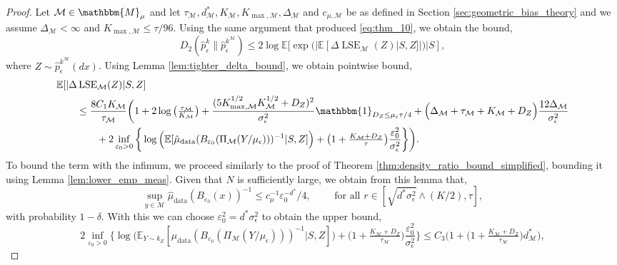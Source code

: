 \documentclass[10pt]{article}
\theoremstyle{plain}
\theoremstyle{definition}
\theoremstyle{remark}
\newcommand{\M}{{\mathcal{M}}}
\newcommand{\lse}{\operatorname{LSE}}
\newcommand{\E}{\mathbb{E}}
\newcommand{\gap}{\Delta_\M}
\begin{document}
\begin{proof}
Let \(\M \in \mathbbm{M}_\mu\) and let \(\tau_\M, d^*_\M, K_\M, K_{\max, \M}, \gap\) and \(c_{\mu, \M}\) be as defined in Section \ref{sec:geometric_bias_theory} and we assume \(\gap < \infty\) and \(K_{\max, \M} \leq \tau/96\). Using the same argument that produced \eqref{eq:thm_10}, we obtain the bound,
\begin{equation*}
    D_2(\hat{p}_\epsilon^k \| \hat{p}_\epsilon^{k^\M}) \leq 2 \log \E[\exp ( | \E[\Delta \lse_\M(Z)|S, Z] |) | S],
\end{equation*}
where \(Z \sim \hat{p}_\epsilon^{k^\M}(dx)\). Using Lemma \ref{lem:tighter_delta_bound}, we obtain pointwise bound,
\begin{align*}
    &\E[|\Delta \lse_\M(Z)|S, Z]\\
    & \qquad \leq \frac{8C_1 K_\M}{\tau_\M} \bigg ( 1 + 2\log \big ( \tfrac{\tau_\M}{K_\M} \big ) + \frac{(5 K_{\max, \M}^{1/2} K_\M^{1/2} + D_Z)^2}{\sigma_\epsilon^2} \mathbbm{1}_{D_Z \leq \mu_\epsilon \tau/4} + \Big (\gap + \tau_\M + K_\M + D_Z \Big ) \frac{12 \gap}{\sigma_\epsilon^2}\\
    & \qquad \qquad + 2\inf_{\varepsilon_0 > 0} \bigg \{ \log \Big ( \E [ \hat{\mu}_{\operatorname{data}}(B_{\varepsilon_0}(\Pi_\M(Y/\mu_\epsilon)))^{-1} | S, Z ] \Big ) + \big ( 1 + \tfrac{K_\M + D_Z}{\tau} \big ) \frac{\varepsilon_0^2}{\sigma_\epsilon^2} \bigg \} \bigg ).
\end{align*}
To bound the term with the infimum, we proceed similarly to the proof of Theorem \ref{thm:density_ratio_bound_simplified}, bounding it using Lemma \ref{lem:lower_emp_meas}. Given that \(N\) is sufficiently large, we obtain from this lemma that,
\begin{equation*}
    \sup_{y \in \M} \hat{\mu}_{\operatorname{data}}(B_{\varepsilon_0}(x))^{-1} \leq c_\mu^{-1} \varepsilon_0^{-d^*} / 4, \qquad \text{ for all } r \in [\sqrt{d^*\sigma_\epsilon^2} \wedge (K/2), \tau],
\end{equation*}
with probability \(1-\delta\). With this we can choose \(\varepsilon_0^2 = d^* \sigma_\epsilon^2\) to obtain the upper bound,
\begin{equation*}
    2\inf_{\varepsilon_0 > 0} \bigg \{ \log \Big ( \E_{Y \sim k_Z} [ \hat{\mu}_{\operatorname{data}}(B_{\varepsilon_0}(\Pi_\M(Y/\mu_\epsilon)))^{-1} | S, Z ] \Big ) + \big ( 1 + \tfrac{K_\M + D_Z}{\tau_\M} \big ) \frac{\varepsilon_0^2}{\sigma_\epsilon^2} \bigg \} \leq C_3\bigg ( 1 + \Big ( 1 + \tfrac{K_\M + D_Z}{\tau_\M} \Big ) d_\M^* \bigg ),
\end{equation*}

\end{proof}
\end{document}
